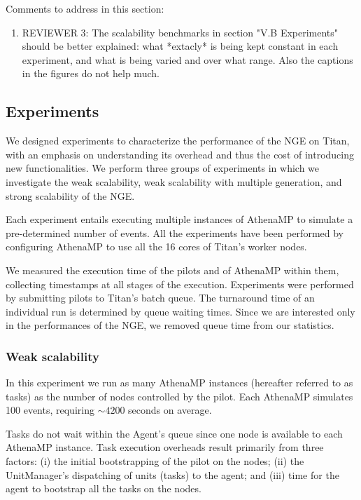 \ifreview
Comments to address in this section:
\begin{enumerate}
    \color{red} 
    \item REVIEWER 3: The scalability benchmarks in section "V.B Experiments"
    should be better explained: what *extacly* is being kept constant in each
    experiment, and what is being varied and over what range. Also the
    captions in the figures do not help much.
\end{enumerate}
\fi

\subsection{Experiments}\label{sec:ngeExp}

We designed experiments to characterize the performance of the NGE on Titan,
with an emphasis on understanding its overhead and thus the cost of
introducing new functionalities. We perform three groups of experiments in
which we investigate the weak scalability, weak scalability with multiple
generation, and strong scalability of the NGE\@.

Each experiment entails executing multiple instances of AthenaMP to simulate
a pre-determined number of events. All the experiments have been performed by
configuring AthenaMP to use all the 16 cores of Titan's worker nodes.

We measured the execution time of the pilots and of AthenaMP within them,
collecting timestamps at all stages of the execution. Experiments were
performed by submitting pilots to Titan's batch queue. The turnaround
time of an individual run is determined by queue waiting times. Since we are
interested only in the performances of the NGE, we removed queue time from
our statistics.

\subsubsection{Weak scalability}

In this experiment we run as many AthenaMP instances (hereafter referred to
as tasks) as the number of nodes controlled by the pilot. Each AthenaMP
simulates 100 events, requiring \(\sim 4200\) seconds on average.

Tasks do not wait within the Agent's queue since one node is available to
each AthenaMP instance. Task execution  overheads result primarily from
three factors: (i) the initial bootstrapping of the pilot on the nodes; (ii)
the UnitManager's dispatching of units (tasks) to the agent; and (iii) time
for the agent to bootstrap all the tasks on the nodes.

